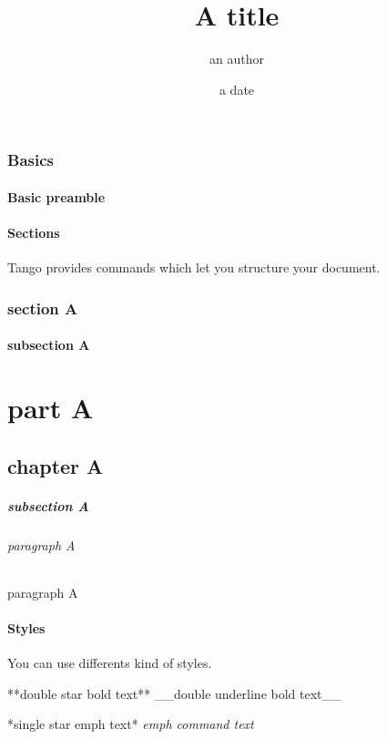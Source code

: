 \section{Basics}
\subsection{Basic preamble}

\begin{code}[langague=tango]
  
  \title{A title}
  \author{an author}
  \date{a date}

\end{code}


\subsection{Sections}

Tango provides commands which let you structure your document.

\begin{code}[langague=tango]
\section{section A}
\subsection{subsection A}
\part{part A}
\chapter{chapter A}
\subsubsection{subsection A}
\paragraph{paragraph A}
\subparagraph{paragraph A}
\end{code}


\subsection{Styles}
You can use differents kind of styles.

\begin{code}[langague=tango]
**double star bold text**
__double underline bold text__

*single star emph text*
\emph{emph command text}
\end{code}


